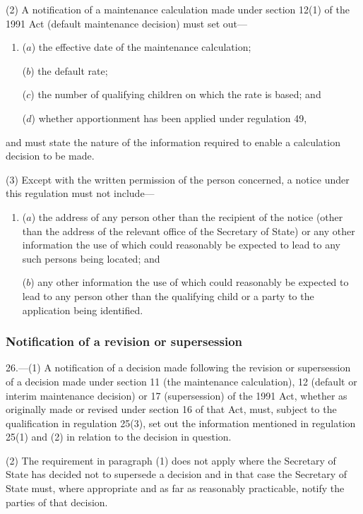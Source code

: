 \documentclass[12pt,a4paper]{article}
\begin{document}
(2) A notification of a maintenance calculation made under section 12(1) of the 1991 Act (default maintenance decision) must set out—
\begin{enumerate}\item[]
($a$) the effective date of the maintenance calculation;

($b$) the default rate;

($c$) the number of qualifying children on which the rate is based; and

($d$) whether apportionment has been applied under regulation 49,
\end{enumerate}
and must state the nature of the information required to enable a calculation decision to be made.

(3) Except with the written permission of the person concerned, a notice under this regulation must not include—
\begin{enumerate}\item[]
($a$) the address of any person other than the recipient of the notice (other than the address of the relevant office of the Secretary of State) or any other information the use of which could reasonably be expected to lead to any such persons being located; and

($b$) any other information the use of which could reasonably be expected to lead to any person other than the qualifying child or a party to the application being identified.
\end{enumerate}

\subsubsection[26. Notification of a revision or supersession]{Notification of a revision or supersession}

26.---(1)  A notification of a decision made following the revision or supersession of a decision made under section 11 (the maintenance calculation), 12 (default or interim maintenance decision) or 17 (supersession) of the 1991 Act, whether as originally made or revised under section 16 of that Act, must, subject to the qualification in regulation 25(3), set out the information mentioned in regulation 25(1) and (2) in relation to the decision in question.

(2) The requirement in paragraph (1) does not apply where the Secretary of State has decided not to supersede a decision and in that case the Secretary of State must, where appropriate and as far as reasonably practicable, notify the parties of that decision.
\end{document}
